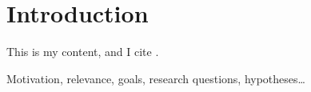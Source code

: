 \section{Introduction}
  This is my content, and I cite \cite{Author_Year_Title}.

  Motivation, relevance, goals, research questions, hypotheses\ldots

